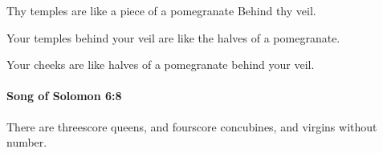 			\begin{versebox}
					\item[BHS] 
					\item[LXX] 
					\item[ASV] Thy temples are like a piece of a pomegranate Behind thy veil.
					\item[NIV] Your temples behind your veil are like the halves of a pomegranate.
					\item[NRSV] Your cheeks are like halves of a pomegranate behind your veil.
			\end{versebox}

		\paragraph{Song of Solomon 6:8} %
			\label{SONGOFSOLOMON-6-8}

			There are threescore queens, and fourscore concubines, and virgins without number.

